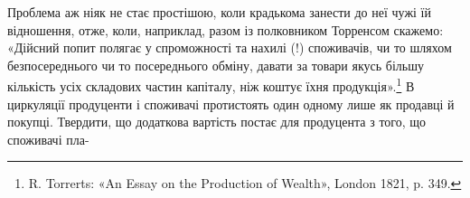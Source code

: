 Проблема аж ніяк не стає простішою, коли крадькома занести
до неї чужі їй відношення, отже, коли, наприклад, разом із полковником
Торренсом скажемо: «Дійсний попит полягає у спроможності
та нахилі (!) споживачів, чи то шляхом безпосереднього
чи то посереднього обміну, давати за товари якусь більшу
кількість усіх складових частин капіталу, ніж коштує їхня продукція».\footnote{
R. Torrerts: «An Essay on the Production of Wealth», London
1821, p. 349.
}
В циркуляції продуценти і споживачі протистоять
один одному лише як продавці й покупці. Твердити, що додаткова
вартість постає для продуцента з того, що споживачі пла-